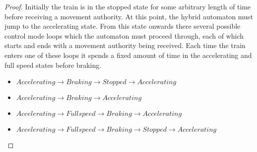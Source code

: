 \begin{mytheorem}
\begin{proof}
Initially the train is in the stopped state for some arbitrary length of time before receiving a movement authority. At this point, the hybrid automaton must jump to the accelerating state. From this state onwards there several possible control mode loops which the automaton must proceed through, each of which starts and ends with a movement authority being received. Each time the train enters one of these loops it spends a fixed amount of time in the accelerating and full speed states before braking.

\begin{itemize}
\item $Accelerating \to Braking \to Stopped \to Accelerating $
\item $Accelerating \to Braking \to Accelerating$
\item $Accelerating \to Full speed \to Braking \to Accelerating$
\item $Accelerating \to Full speed \to Braking \to Stopped \to Accelerating$
\end{itemize}


\end{proof}
\end{mytheorem}





